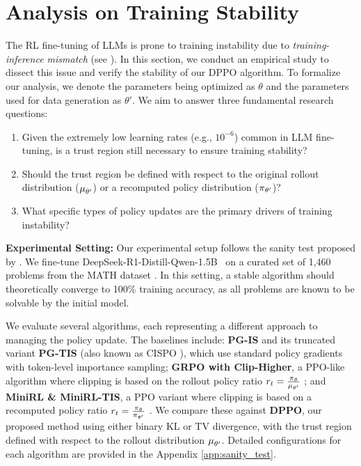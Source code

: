 

\section{Analysis on Training Stability}  
\label{sec:stability}  

The RL fine-tuning of LLMs is prone to training instability due to \textit{training-inference mismatch} (see ). 
In this section, we conduct an empirical study to dissect this issue and verify the stability of our DPPO algorithm.
To formalize our analysis, we denote the parameters being optimized as $\theta$ and the parameters used for data generation as $\theta'$. We aim to answer three fundamental research questions:
\begin{enumerate}[nosep]
    \item Given the extremely low learning rates (e.g., $10^{-6}$) common in LLM fine-tuning, is a trust region still necessary to ensure training stability?  
    \item Should the trust region be defined with respect to the original rollout distribution ($\operatorname*{{\textcolor{black}{\mu}}}_{\theta'}$) or a recomputed policy distribution ($\operatorname*{{\textcolor{black}{\pi}}}_{\theta'}$)?  
    \item What specific types of policy updates are the primary drivers of training instability?  
\end{enumerate}

\textbf{Experimental Setting:}
Our experimental setup follows the sanity test proposed by \citet{qi2025defeating}. We fine-tune DeepSeek-R1-Distill-Qwen-1.5B~\citep{guo2025deepseekr1} on a curated set of 1,460 problems from the MATH dataset \citep{hendrycks2021measuring}. In this setting, a stable algorithm should theoretically converge to 100\% training accuracy, as all problems are known to be solvable by the initial model. 

We evaluate several algorithms, each representing a different approach to managing the policy update. The baselines include: \textbf{PG-IS} and its truncated variant \textbf{PG-TIS} (also known as CISPO \citep{chen2025minimax}), which use standard policy gradients with token-level importance sampling; \textbf{GRPO with Clip-Higher}, a PPO-like algorithm where clipping is based on the rollout policy ratio $r_t = \frac{\operatorname*{{\textcolor{black}{\pi}}}_\theta}{\operatorname*{{\textcolor{black}{\mu}}}_{\theta'}}$ \citep{shao2024deepseekmath, liu2025understanding}; and \textbf{MiniRL \& MiniRL-TIS}, a PPO variant where clipping is based on a recomputed policy ratio $r_t = \frac{\operatorname*{{\textcolor{black}{\pi}}}_\theta}{\operatorname*{{\textcolor{black}{\pi}}}_{\theta'}}$ \citep{zheng2025stabilizing}. We compare these against \textbf{DPPO}, our proposed method using either binary KL or TV divergence, with the trust region defined with respect to the rollout distribution $\operatorname*{{\textcolor{black}{\mu}}}_{\theta'}$. Detailed configurations for each algorithm are provided in the Appendix \ref{app:sanity_test}.

